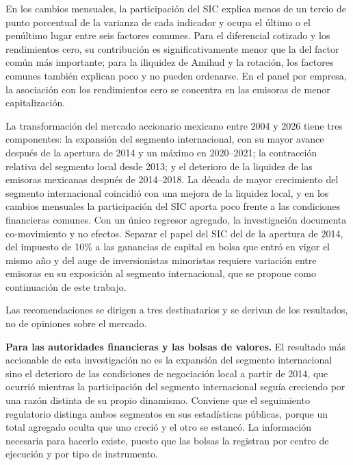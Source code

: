 
En los cambios mensuales, la participación del SIC explica menos de un tercio de punto porcentual de la varianza de cada indicador y ocupa el último o el penúltimo lugar entre seis factores comunes. Para el diferencial cotizado y los rendimientos cero, su contribución es significativamente menor que la del factor común más importante; para la iliquidez de Amihud y la rotación, los factores comunes también explican poco y no pueden ordenarse. En el panel por empresa, la asociación con los rendimientos cero se concentra en las emisoras de menor capitalización.


La transformación del mercado accionario mexicano entre 2004 y 2026 tiene tres componentes: la expansión del segmento internacional, con su mayor avance después de la apertura de 2014 y un máximo en 2020--2021; la contracción relativa del segmento local desde 2013; y el deterioro de la liquidez de las emisoras mexicanas después de 2014--2018. La década de mayor crecimiento del segmento internacional coincidió con una mejora de la liquidez local, y en los cambios mensuales la participación del SIC aporta poco frente a las condiciones financieras comunes. Con un único regresor agregado, la investigación documenta co-movimiento y no efectos. Separar el papel del SIC del de la apertura de 2014, del impuesto de 10\% a las ganancias de capital en bolsa que entró en vigor el mismo año y del auge de inversionistas minoristas requiere variación entre emisoras en su exposición al segmento internacional, que se propone como continuación de este trabajo.


Las recomendaciones se dirigen a tres destinatarios y se derivan de los resultados, no de opiniones sobre el mercado.

\textbf{Para las autoridades financieras y las bolsas de valores.} El resultado más accionable de esta investigación no es la expansión del segmento internacional sino el deterioro de las condiciones de negociación local a partir de 2014, que ocurrió mientras la participación del segmento internacional seguía creciendo por una razón distinta de su propio dinamismo. Conviene que el seguimiento regulatorio distinga ambos segmentos en sus estadísticas públicas, porque un total agregado oculta que uno creció y el otro se estancó. La información necesaria para hacerlo existe, puesto que las bolsas la registran por centro de ejecución y por tipo de instrumento.

